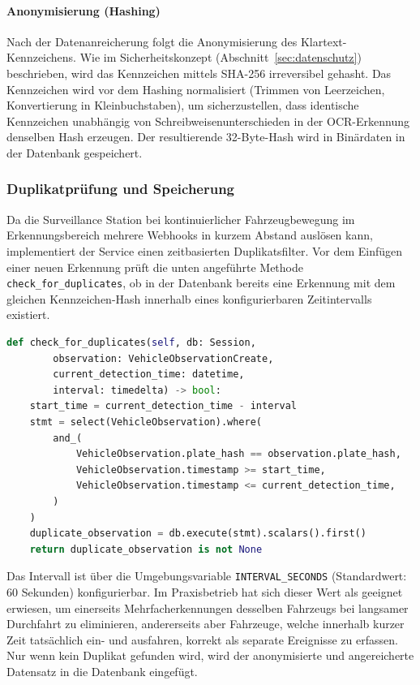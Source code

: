 \paragraph{Anonymisierung (Hashing)}
Nach der Datenanreicherung folgt die Anonymisierung des Klartext-Kennzeichens.
Wie im Sicherheitskonzept (Abschnitt~\ref{sec:datenschutz}) beschrieben, wird das Kennzeichen mittels SHA-256 irreversibel gehasht.
Das Kennzeichen wird vor dem Hashing normalisiert (Trimmen von Leerzeichen, Konvertierung in Kleinbuchstaben), um sicherzustellen, dass identische Kennzeichen unabhängig von Schreibweisenunterschieden in der OCR-Erkennung denselben Hash erzeugen.
Der resultierende 32-Byte-Hash wird in Binärdaten in der Datenbank gespeichert.


\subsubsection{Duplikatprüfung und Speicherung}
\label{sec:duplikatpruefung}

Da die Surveillance Station bei kontinuierlicher Fahrzeugbewegung im Erkennungsbereich mehrere Webhooks in kurzem Abstand auslösen kann, implementiert der Service einen zeitbasierten Duplikatsfilter.
Vor dem Einfügen einer neuen Erkennung prüft die unten angeführte Methode \texttt{check\_for\_duplicates}, ob in der Datenbank bereits eine Erkennung mit dem gleichen Kennzeichen-Hash innerhalb eines konfigurierbaren Zeitintervalls existiert.

\begin{lstlisting}[language=Python, caption={Zeitfensterbasierte Duplikatserkennung}, label={lst:duplicates}]
def check_for_duplicates(self, db: Session,
        observation: VehicleObservationCreate,
        current_detection_time: datetime,
        interval: timedelta) -> bool:
    start_time = current_detection_time - interval
    stmt = select(VehicleObservation).where(
        and_(
            VehicleObservation.plate_hash == observation.plate_hash,
            VehicleObservation.timestamp >= start_time,
            VehicleObservation.timestamp <= current_detection_time,
        )
    )
    duplicate_observation = db.execute(stmt).scalars().first()
    return duplicate_observation is not None
\end{lstlisting}

Das Intervall ist über die Umgebungsvariable \texttt{INTERVAL\_SECONDS} (Standardwert: 60 Sekunden) konfigurierbar.
Im Praxisbetrieb hat sich dieser Wert als geeignet erwiesen, um einerseits Mehrfacherkennungen desselben Fahrzeugs bei langsamer Durchfahrt zu eliminieren, andererseits aber Fahrzeuge, welche innerhalb kurzer Zeit tatsächlich ein- und ausfahren, korrekt als separate Ereignisse zu erfassen.
Nur wenn kein Duplikat gefunden wird, wird der anonymisierte und angereicherte Datensatz in die Datenbank eingefügt.

